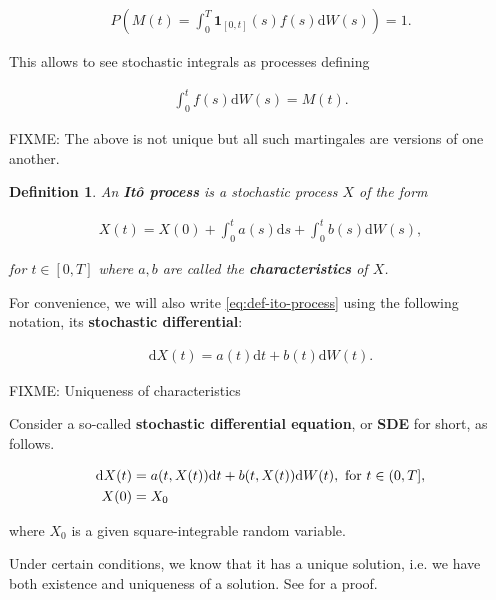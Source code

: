 \documentclass[a4paper]{article}
\newtheorem{definition}{Definition}[section]
\begin{document}
\begin{align*}
  P\left(M(t) = \int_0^T \mathbf{1}_{[0,t]}(s) f(s) \mathrm{d}W(s)\right) = 1.
\end{align*}

This allows to see stochastic integrals as processes defining

\begin{align*}
  \int_0^t f(s) \mathrm{d}W(s) = M(t).
\end{align*}

FIXME: The above is not unique but all such martingales are versions of one another.

\begin{definition}
  An \textbf{It\^o process} is a stochastic process $X$ of the form

  \begin{align}\label{def:ito-process}
    X(t) = X(0) + \int_0^t a(s) \mathrm{d}s + \int_0^t b(s) \mathrm{d}W(s),
  \end{align}

  for $t \in [0,T]$ where $a,b$ are called the \textbf{characteristics} of $X$.
\end{definition}

For convenience, we will also write \eqref{eq:def-ito-process} using the following notation, its \textbf{stochastic differential}:

\begin{align}\label{eq:stoch-diff-notation}
  \mathrm{d}X(t) = a(t) \mathrm{d}t + b(t) \mathrm{d}W(t).
\end{align}

FIXME: Uniqueness of characteristics

Consider a so-called \textbf{stochastic differential equation}, or \textbf{SDE} for short, as follows.

\begin{align}\label{eq:sde-init-value}
  \mathrm{d}X(t) &= a(t,X(t)) \mathrm{d}t + b(t,X(t)) \mathrm{d}W(t), \text{ for } t \in (0,T],\\
  X(0) &= X_0\notag
\end{align}

where $X_0$ is a given square-integrable random variable.

Under certain conditions, we know that it has a unique solution, i.e. we have both existence and uniqueness of a solution. See \textcite{capinski_stochastic_2012} for a proof.
\end{document}
